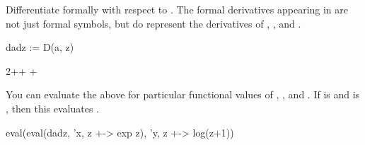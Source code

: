 {{{{{{{{\begin{xtc}
\begin{xtccomment}
Differentiate formally with respect to .
The formal derivatives appearing in  are not just formal symbols,
but do represent the derivatives of , , and .
\end{xtccomment}
\begin{spadsrc}
dadz := D(a, z)
\end{spadsrc}
\begin{TeXOutput}
\begin{fricasmath}{10}
2\TIMES {}\TIMES {}+\TIMES {}+%
\TIMES {}+\TIMES {}%
\end{fricasmath}
\end{TeXOutput}
\end{xtc}
\begin{xtc}
\begin{xtccomment}
You can evaluate the above for particular functional
values of , , and .
If  is  and  is , then
this evaluates .
\end{xtccomment}
\begin{spadsrc}
eval(eval(dadz, 'x, z +-> exp z), 'y, z +-> log(z+1))
\end{spadsrc}
\begin{TeXOutput}
\begin{fricasmath}{11}
%
\end{fricasmath}
\end{TeXOutput}

\end{xtc}}}}}}}}}
